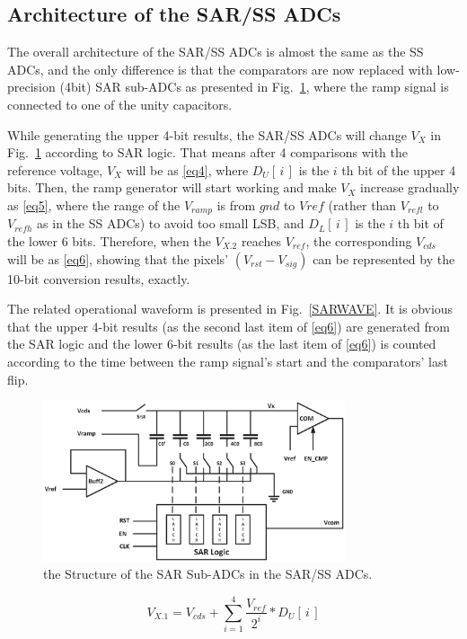 \documentclass[conference]{IEEEtran}
\begin{document}
\subsection{Architecture of the SAR/SS ADCs}

The overall architecture of the SAR/SS ADCs is almost the same as the SS ADCs, and the only difference is that the comparators are now replaced with low-precision (4bit) SAR sub-ADCs as presented in Fig.~\ref{SAR}, where the ramp signal is connected to one of the unity capacitors. 

While generating the upper 4-bit results, the SAR/SS ADCs will change $V_{X}$ in Fig.~\ref{SAR} according to SAR logic. That means after 4 comparisons with the reference voltage, $V_{X}$ will be as \eqref{eq4}, where $D_{U}\left[\,i\,\right]$ is the $i$ th bit of the upper 4 bits. Then, the ramp generator will start working and make $V_{X}$ increase gradually as \eqref{eq5}, where the range of the $V_{ramp}$ is  from $gnd$ to $Vref$ (rather than $V_{refl}$ to $V_{refh}$ as in the SS ADCs) to avoid too small LSB, and $D_{L}\left[\,i\,\right]$ is the $i$ th bit of the lower 6 bits. Therefore, when the $V_{X.2}$ reaches $V_{ref}$, the corresponding $V_{cds}$ will be as \eqref{eq6}, showing that the pixels' $(V_{rst}-V_{sig})$ can be represented by the 10-bit conversion results, exactly. 

The related operational waveform is presented in Fig.~\ref{SARWAVE}. It is obvious that the upper 4-bit results (as the second last item of \eqref{eq6}) are generated from the SAR logic and the lower 6-bit results (as the last item of \eqref{eq6}) is counted according to the time between the ramp signal’s start and the comparators’ last flip. 
\begin{figure}[htbp]
	\centerline{\includegraphics[width=3.5in]{./Figures/SAR.eps}}
	\caption{the Structure of the SAR Sub-ADCs in the SAR/SS ADCs.}
	\label{SAR}
\end{figure} 

\begin{equation}
	V_{X.1}=V_{cds}+\sum_{i=1}^{4} {\frac{V_{ref}}{2^{i}}\ast{D_{U}\left[\,i\,\right]}}
	\label{eq4}
\end{equation}
\end{document}
